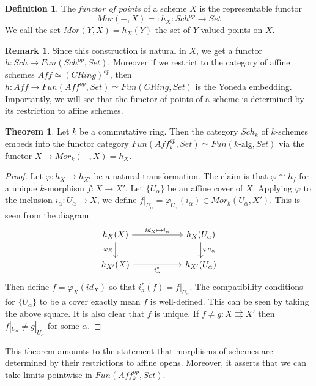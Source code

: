\documentclass[letterpaper,10pt,twoside]{amsart}
\theoremstyle{proposition}
\theoremstyle{definition}
\newtheorem{definition}[proposition]{Definition}
\theoremstyle{theorem}
\newtheorem{theorem}[proposition]{Theorem}
\theoremstyle{definition}
\newtheorem{remark}[proposition]{\textbf{Remark}}
\theoremstyle{definition}
\theoremstyle{definition}
\theoremstyle{lemma}
\theoremstyle{definition}
\theoremstyle{definition}
\theoremstyle{corollary}
\theoremstyle{definition}
\begin{document}
\begin{definition}
    The \textit{functor of points} of a scheme $X$ is the representable functor \[Mor(-,X)=:h_X: Sch^{op}\to Set\] We call the set $Mor(Y,X)=h_X(Y)$ the set of $Y$-valued points on $X$.
\end{definition}
\begin{remark}
    Since this construction is natural in $X$, we get a functor $h:Sch\to Fun(Sch^{op},Set)$. Moreover if we restrict to the category of affine schemes $Aff\simeq (CRing)^{op}$, then $h:Aff\to Fun(Aff^{op},Set) \simeq Fun(CRing,Set)$ is the Yoneda embedding. Importantly, we will see that the functor of points of a scheme is determined by its restriction to affine schemes.
\end{remark}

\begin{theorem}\cite{EH}
Let $k$ be a commutative ring. Then the category $Sch_k$ of $k$-schemes embeds into the functor category $Fun(Aff_k^{op},Set)\simeq Fun(k\text{-alg},Set)$ via the functor $X\mapsto Mor_k(-,X)=h_X$.
\end{theorem}
\begin{proof}
    Let $\varphi: h_X\to h_{X'}$ be a natural transformation. The claim is that $\varphi\cong h_f$ for a unique $k$-morphism $f:X\to X'$. Let $\{U_\alpha\}$ be an affine cover of $X$. Applying $\varphi$ to the inclusion $i_\alpha:U_\alpha\to X$, we define $f|_{U_\alpha} = \varphi_{U_\alpha}(i_\alpha)\in Mor_k(U_\alpha,X')$. This is seen from the diagram \[\begin{tikzcd}
	{h_X(X)} & {} & {h_X(U_\alpha)} \\
	{h_{X'}(X)} & {} & {h_{X'}(U_\alpha)}
	\arrow["{id_X\mapsto i_\alpha}", from=1-1, to=1-3]
	\arrow["{\varphi_X}"', from=1-1, to=2-1]
	\arrow["{\varphi_{U_\alpha}}", from=1-3, to=2-3]
	\arrow["{i_\alpha^*}"', from=2-1, to=2-3]
\end{tikzcd}\] Then define $f = \varphi_X(id_X)$ so that $i_a^*(f)=f|_{U_\alpha}$. The compatibility conditions for $\{U_\alpha\}$ to be a cover exactly mean $f$ is well-defined. This can be seen by taking the above square. It is also clear that $f$ is unique. If $f\neq g: X \rightrightarrows X'$ then $f|_{U_\alpha} \neq g|_{U_{\alpha}}$ for some $\alpha$.
\end{proof} 

This theorem amounts to the statement that morphisms of schemes are determined by their restrictions to affine opens. Moreover, it asserts that we can take limits pointwise in $Fun(Aff_k^{op},Set)$. 
\end{document}
